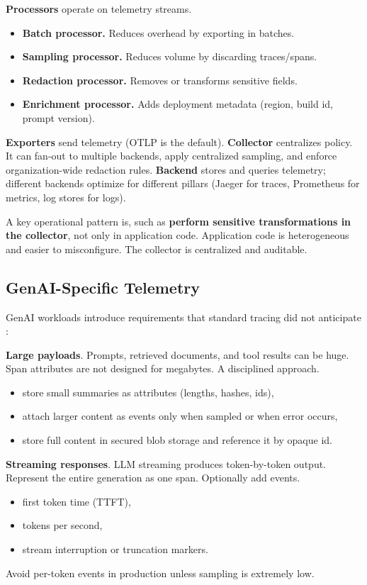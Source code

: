 \textbf{Processors} operate on telemetry streams.
\begin{itemize}
\item \textbf{Batch processor.} Reduces overhead by exporting in batches.
\item \textbf{Sampling processor.} Reduces volume by discarding traces/spans.
\item \textbf{Redaction processor.} Removes or transforms sensitive fields.
\item \textbf{Enrichment processor.} Adds deployment metadata (region, build id, prompt version).
\end{itemize}

\textbf{Exporters} send telemetry (OTLP is the default).  
\textbf{Collector} centralizes policy. It can fan-out to multiple backends, apply centralized sampling, and enforce organization-wide redaction rules.  
\textbf{Backend} stores and queries telemetry; different backends optimize for different pillars (Jaeger for traces, Prometheus for metrics, log stores for logs).

A key operational pattern is, such as \textbf{perform sensitive transformations in the collector}, not only in application code. Application code is heterogeneous and easier to misconfigure. The collector is centralized and auditable.

\subsection{GenAI-Specific Telemetry}

GenAI workloads introduce requirements that standard tracing did not anticipate \cite{otelgenai2025}:

\textbf{Large payloads}. Prompts, retrieved documents, and tool results can be huge. Span attributes are not designed for megabytes. A disciplined approach.
\begin{itemize}
\item store small summaries as attributes (lengths, hashes, ids),
\item attach larger content as events only when sampled or when error occurs,
\item store full content in secured blob storage and reference it by opaque id.
\end{itemize}

\textbf{Streaming responses}. LLM streaming produces token-by-token output. Represent the entire generation as one span. Optionally add events.
\begin{itemize}
\item first token time (TTFT),
\item tokens per second,
\item stream interruption or truncation markers.
\end{itemize}
Avoid per-token events in production unless sampling is extremely low.

